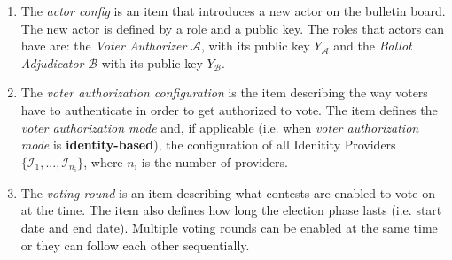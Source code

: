 \begin{enumerate}
    \item The \textit{actor config} is an item that introduces a new actor on the bulletin board. The new actor is defined by a role and a public key. The roles that actors can have are: the \textit{Voter Authorizer} $\mathcal{A}$, with its public key $Y_\mathcal{A}$ and the \textit{Ballot Adjudicator} $\mathcal{B}$ with its public key $Y_\mathcal{B}$.

    \item The \textit{voter authorization configuration} is the item describing the way voters have to authenticate in order to get authorized to vote. The item defines the \textit{voter authorization mode} and, if applicable (i.e. when \textit{voter authorization mode} is \textbf{identity-based}), the configuration of all Idenitity Providers $\{\mathcal{I}_1, ..., \mathcal{I}_{n_\mathrm{i}}\}$, where $n_\mathrm{i}$ is the number of providers.
    
    \item The \textit{voting round} is an item describing what contests are enabled to vote on at the time. The item also defines how long the election phase lasts (i.e. start date and end date). Multiple voting rounds can be enabled at the same time or they can follow each other sequentially.
\end{enumerate}

